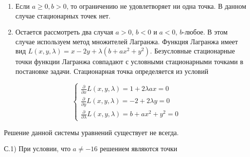 \documentclass[addpoints, answers]{exam} %
\begin{document}
\begin{questions}
\begin{solution}
\begin{enumerate}
\item  Если $a\ge 0,b>0$, то ограничению не удовлетворяет ни одна точка. В данном случае стационарных точек нет.

\item  Остается рассмотреть два случая $a>0$, $b<0$ и $a<0$, $b$-любое. В этом случае используем метод множителей Лагранжа. Функция Лагранжа имеет вид $L\left(x,y,\lambda \right)=x-2y+\lambda \left(b+ax^{2} +y^{2} \right)$. Безусловные стационарные точки функции Лагранжа совпадают с условными стационарными точками в постановке задачи. Стационарная точка определяется из условий 
\end{enumerate}

\[
\left\{\begin{array}{c} {\frac{\partial }{\partial x} L\left(x,y,\lambda \right)=1+2\lambda ax=0} \\ {\frac{\partial }{\partial y} L\left(x,y,\lambda \right)=-2+2\lambda y=0} \\ {\frac{\partial }{\partial \lambda } L\left(x,y,\lambda \right)=b+ax^{2} +y^{2} =0} \end{array}\right. 
\] 

Решение данной системы уравнений существует не всегда. 

С.1) При условии, что $a\ne -16$ решением являются точки


\end{solution}
\end{questions}
\end{document}
